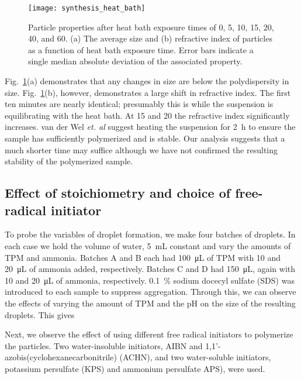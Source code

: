 \begin{figure}
    \centering
    \texttt{[image: synthesis\_heat\_bath]}
    \caption{Particle properties after heat bath exposure times of \num{0}, \num{5},
      \num{10}, \num{15}, \num{20}, \num{40}, and \SI{60}{\min}.
      (a) The average size and (b) refractive index of particles as a function
      of heat bath exposure time. Error bars indicate a single median absolute deviation
      of the associated property.}
    \label{fig:heat_size_time}
\end{figure}

Fig.~\ref{fig:heat_size_time}(a) demonstrates that any changes in size are below
the polydispersity in size. Fig.~\ref{fig:heat_size_time}(b), however, demonstrates
a large shift in refractive index. The first ten minutes are nearly identical;
presumably this is while the suspension is equilibrating with the heat bath.
At \num{15} and \SI{20}{\min} the refractive index significantly increases.
van der Wel \emph{et. al} \cite{vanderwel17} suggest heating the suspension
for \SI{2}{\hour} to ensure the sample has sufficiently polymerized and is
stable. Our analysis suggests that a much shorter time may suffice although
we have not confirmed the resulting stability of the polymerized sample.



\subsection{Effect of stoichiometry and choice of free-radical initiator}

To probe the variables of droplet formation, we make four batches of droplets.
In each case we hold the volume of water, \SI{5}{\milli \liter} constant 
and vary the amounts of TPM and ammonia. Batches A and B each had 
\SI{100}{\micro\liter} of TPM with \si{10} and \SI{20}{\micro\liter} of 
ammonia added, respectively. Batches C and D had \SI{150}{\micro\liter}, 
again with \si{10} and \SI{20}{\micro\liter} of ammonia, respectively. 
\SI{0.1}{\percent} sodium docecyl sulfate (SDS) was introduced to
each sample to suppress aggregation. Through this, we can observe the effects of
varying the amount of TPM and the pH on the size of the resulting droplets.
This gives 

Next, we observe the effect of using different free radical initiators 
to polymerize the particles. Two water-insoluble initiators, AIBN and
\num{1},\num{1}'-azobis(cyclohexanecarbonitrile) (ACHN), and two water-soluble 
initiators, potassium persulfate (KPS) and ammonium persulfate APS), were 
used.

